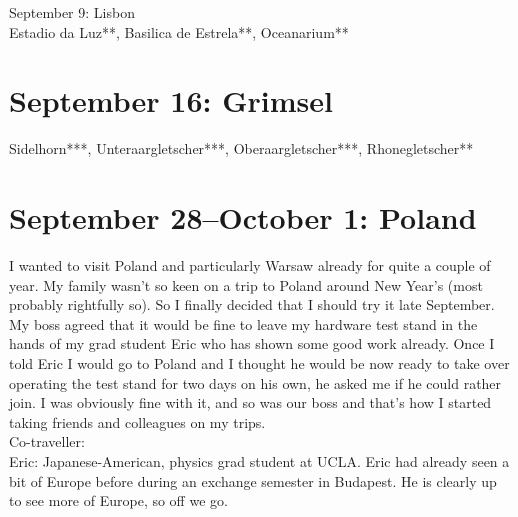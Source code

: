 September 9: Lisbon\\
Estadio da Luz**, Basilica de Estrela**, Oceanarium**

\section{September 16: Grimsel}
\label{Grimsel2012}

Sidelhorn***, Unteraargletscher***, Oberaargletscher***, Rhonegletscher**

\section{September 28--October 1: Poland}
\label{Poland2012}

I wanted to visit Poland and particularly Warsaw already for quite a couple of year. My family wasn't so keen on a trip to Poland around New Year's (most probably rightfully so). So I finally decided that I should try it late September. My boss agreed that it would be fine to leave my hardware test stand in the hands of my grad student Eric who has shown some good work already. Once I told Eric I would go to Poland and I thought he would be now ready to take over operating the test stand for two days on his own, he asked me if he could rather join. I was obviously fine with it, and so was our boss and that's how I started taking friends and colleagues on my trips.\\

Co-traveller:\\
Eric: Japanese-American, physics grad student at UCLA. Eric had already seen a bit of Europe before during an exchange semester in Budapest. He is clearly up to see more of Europe, so off we go.\\

